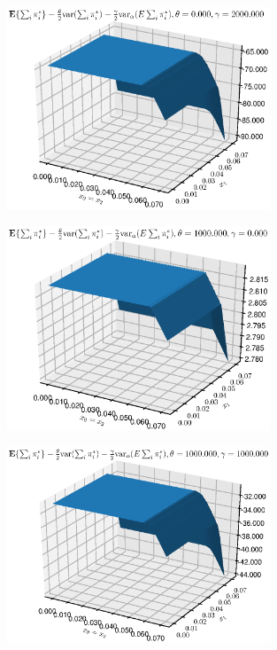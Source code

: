 \begin{figure}[htbp] %
   \centering
   \includegraphics[width=0.7\textwidth]{Figures/AToy/Atoy-FCP000200000} 
\end{figure}

\begin{figure}[htbp] %
   \centering
   \includegraphics[width=0.7\textwidth]{Figures/AToy/Atoy-FCP100000000} 
\end{figure}

\begin{figure}[htbp] %
   \centering
   \includegraphics[width=0.7\textwidth]{Figures/AToy/Atoy-FCP100000100000} 
\end{figure}

